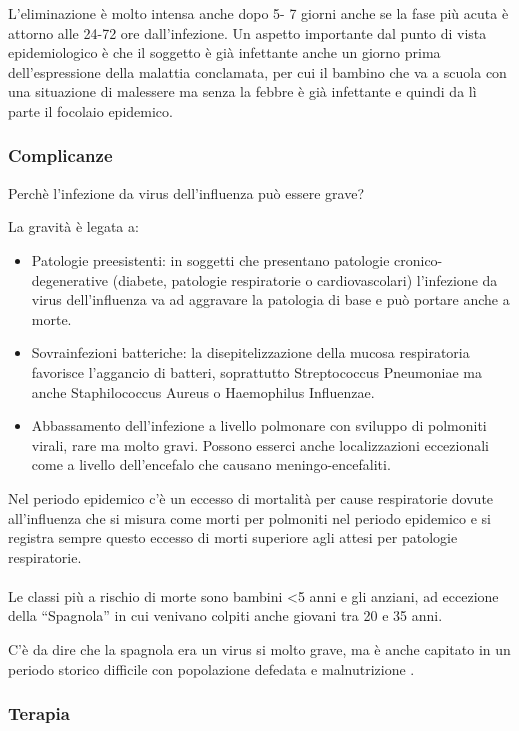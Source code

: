 L'eliminazione è molto intensa anche dopo 5- 7 giorni anche se la fase
più acuta è attorno alle 24-72 ore dall'infezione. Un aspetto importante
dal punto di vista epidemiologico è che il soggetto è già infettante
anche un giorno prima dell'espressione della malattia conclamata, per
cui il bambino che va a scuola con una situazione di malessere ma senza
la febbre è già infettante e quindi da lì parte il focolaio epidemico.

\subsubsection{Complicanze}


Perchè l'infezione da virus dell'influenza può essere grave?

La gravità è legata a:
\begin{itemize}
\item 
  Patologie preesistenti: in soggetti che presentano patologie
cronico-degenerative (diabete, patologie respiratorie o cardiovascolari)
l'infezione da virus dell'influenza va ad aggravare la patologia di base
e può portare anche a morte.
\item 
  Sovrainfezioni batteriche: la disepitelizzazione della mucosa
respiratoria favorisce l'aggancio di batteri, soprattutto Streptococcus
Pneumoniae ma anche Staphilococcus Aureus o Haemophilus Influenzae.
\item 
  Abbassamento dell'infezione a livello polmonare con sviluppo di
polmoniti virali, rare ma molto gravi. Possono esserci anche
localizzazioni eccezionali come a livello dell'encefalo che causano
meningo-encefaliti.
\end{itemize}
Nel periodo epidemico c'è un eccesso di mortalità per cause respiratorie
dovute all'influenza che si misura come morti per polmoniti nel periodo
epidemico e si registra sempre questo eccesso di morti superiore agli
attesi per patologie respiratorie.
\\\\
Le classi più a rischio di morte sono bambini \textless{}5 anni e gli
anziani, ad eccezione della ``Spagnola'' in cui venivano colpiti anche
giovani tra 20 e 35 anni.

C'è da dire che la spagnola era un virus si molto grave, ma è anche
capitato in un periodo storico difficile con popolazione defedata e
malnutrizione .

\subsubsection{Terapia}

